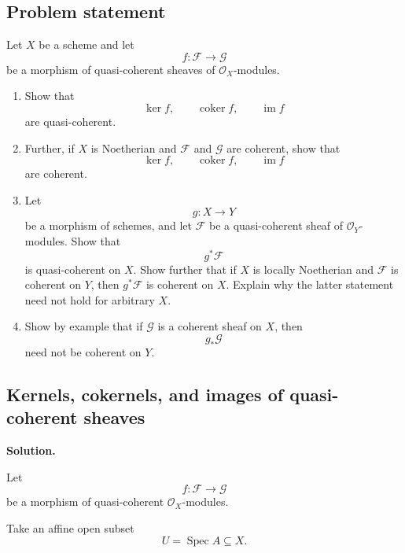 
\subsection*{Problem statement}

Let \(X\) be a scheme and let
\[
f:\mathcal{F}\longrightarrow \mathcal{G}
\]
be a morphism of quasi-coherent sheaves of \(\mathcal{O}_X\)-modules.

\begin{enumerate}[label=(\alph*)]
	\item Show that
	\[
	\ker f,\qquad \operatorname{coker} f,\qquad \operatorname{im} f
	\]
	are quasi-coherent.
	
	\item Further, if \(X\) is Noetherian and \(\mathcal{F}\) and \(\mathcal{G}\) are coherent, show that
	\[
	\ker f,\qquad \operatorname{coker} f,\qquad \operatorname{im} f
	\]
	are coherent.
	
	\item Let
	\[
	g:X\longrightarrow Y
	\]
	be a morphism of schemes, and let \(\mathcal{F}\) be a quasi-coherent sheaf of \(\mathcal{O}_Y\)-modules. Show that
	\[
	g^*\mathcal{F}
	\]
	is quasi-coherent on \(X\). Show further that if $X$ is locally Noetherian
and $\mathcal F$ is coherent on $Y$, then $g^*\mathcal F$ is coherent on $X$.
Explain why the latter statement need not hold for arbitrary $X$.
	
	\item Show by example that if \(\mathcal{G}\) is a coherent sheaf on \(X\), then
	\[
	g_*\mathcal{G}
	\]
	need not be coherent on \(Y\).
\end{enumerate}

\subsection{Kernels, cokernels, and images of quasi-coherent sheaves}

\textbf{Solution.}

Let
\[
f:\mathcal{F}\longrightarrow \mathcal{G}
\]
be a morphism of quasi-coherent \(\mathcal{O}_X\)-modules.

Take an affine open subset
\[
U=\operatorname{Spec} A\subseteq X.
\]

